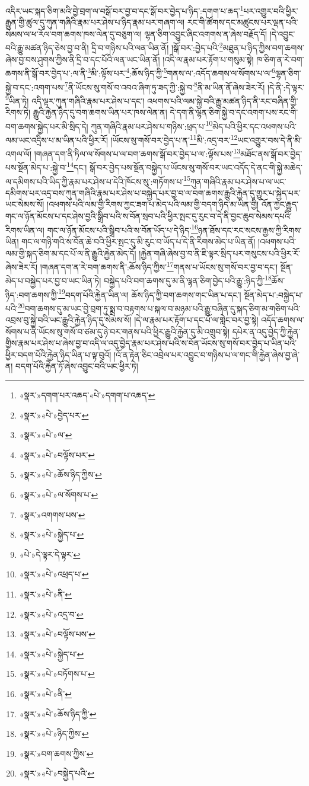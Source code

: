 འདིར་ཡང་སྐད་ཅིག་མའི་བྱེ་བྲག་ལ་བསྒོ་བར་བྱ་བ་དང་སྒོ་བར་བྱེད་པ་ཉིད་:དགག་པ་ཆད་\footnote{«སྣར་»དགག་པར་འཆད་«པེ་»དགག་པ་འཆད་}པར་འགྱུར་བའི་ཕྱིར་རྒྱུན་གྱི་ཚུལ་དུ་ཀུན་གཞིའི་རྣམ་པར་ཤེས་པ་ཉིད་རྣམ་པར་གཞག་ལ། རང་གི་ཚོགས་དང་མཚུངས་པར་ལྡན་པའི་སེམས་ལ་ཕ་རོལ་བག་ཆགས་ཁས་ལེན་དུ་བཅུག་ལ། ལྷན་ཅིག་འབྱུང་ཞིང་འགགས་ན་ཞེས་བརྗོད་དོ། །དེ་འབྱུང་བའི་རྒྱུ་མཚན་ཉིད་ཅེས་བྱ་བ་ནི། དྲི་བ་གཉིས་པའི་ལན་ཡིན་ནོ། །སྒོ་བར་:བྱེད་པའི་\footnote{«སྣར་»«པེ་»བྱེད་པར་}མཐུན་པ་ཉིད་ཀྱིས་བག་ཆགས་ཞེས་བྱ་བས་ཤུགས་ཀྱིས་ནི་དྲི་བ་དང་པོའི་ལན་ཡང་ཡིན་ནོ། །འདི་ལ་རྣམ་པར་རྟོག་པ་གསུམ་སྟེ། ཁ་ཅིག་ན་རེ་བག་ཆགས་ནི་སྒོ་བར་བྱེད་པ་:ལ་ནི་\footnote{«སྣར་»«པེ་»ལ་}མི་:ལྟོས་པར་\footnote{«སྣར་»«པེ་»བལྟོས་པར་}:ཆོས་ཉིད་ཀྱི་\footnote{«སྣར་»«པེ་»ཆོས་ཉིད་ཀྱིས་}གནས་ལ་:འདོད་ཆགས་ལ་སོགས་པ་ལ་\footnote{«སྣར་»«པེ་»ལ་སོགས་པ་}ལྷན་ཅིག་སྐྱེ་བ་དང་:འགག་པས་\footnote{«སྣར་»འགགས་པས་}ནི་ཡོངས་སུ་གསོ་བ་འབའ་ཞིག་ཏུ་ཟད་ཀྱི་:སྐྱེ་བ་\footnote{«སྣར་»«པེ་»སྐྱེད་པ་}ནི་མ་ཡིན་ནོ་ཞེས་ཟེར་རོ། །དེ་ནི་:དེ་ལྟར་\footnote{«པེ་»དེ་ལྟར་དེ་ལྟར་}ཡིན་ཏེ། འདི་ལྟར་ཀུན་གཞིའི་རྣམ་པར་ཤེས་པ་དང་། འཕགས་པའི་ལམ་སྐྱེ་བའི་རྒྱུ་མཚན་ཉིད་ནི་རང་བཞིན་གྱི་རིགས་ཏེ། རྒྱུའི་རྐྱེན་ཉིད་དུ་བག་ཆགས་ཡིན་པར་ཁས་ལེན་ན། དེ་དག་ནི་ལྷན་ཅིག་སྐྱེ་བ་དང་འགག་པས་རང་གི་བག་ཆགས་སྐྱེད་པར་མི་སྲིད་དེ། ཀུན་གཞིའི་རྣམ་པར་ཤེས་པ་གཉིས་:ཕྲད་པ་\footnote{«སྣར་»«པེ་»འཕྲད་པ་}མེད་པའི་ཕྱིར་དང་འཕགས་པའི་ལམ་ཡང་འདྲིས་པ་མ་ཡིན་པའི་ཕྱིར་རོ། །ཡོངས་སུ་གསོ་བར་བྱེད་པ་ན་\footnote{«སྣར་»«པེ་»ནི་}མི་:འདྲ་བར་\footnote{«སྣར་»«པེ་»འདྲ་བ་}ཡང་འགྱུར་བས་དེ་ནི་མི་འགལ་ལོ། །གཞན་དག་ནི་ཏིལ་ལ་སོགས་པ་ལ་བག་ཆགས་སྒོ་བར་བྱེད་པ་ལ་:ལྟོས་པས་\footnote{«སྣར་»«པེ་»བལྟོས་པས་}མཐོང་ནས་སྒོ་བར་བྱེད་པས་སྔོན་མེད་པ་:སྐྱེ་བ་\footnote{«སྣར་»«པེ་»སྐྱེད་པ་}དང་། སྒོ་བར་བྱེད་པས་སྔོན་བསྐྱེད་པ་ཡོངས་སུ་གསོ་བར་ཡང་འདོད་དེ་ནང་གི་སྐྱེ་མཆེད་ལ་དམིགས་པའི་ཡིད་ཀྱི་རྣམ་པར་ཤེས་པ་དེའི་ཁོངས་སུ་:གཏོགས་པ་\footnote{«སྣར་»«པེ་»བཏོགས་པ་}ཀུན་གཞིའི་རྣམ་པར་ཤེས་པ་ལ་ཡང་དམིགས་པར་འདྲ་བས་ཀུན་གཞིའི་རྣམ་པར་ཤེས་པ་བསྐྱེད་པར་བྱ་བ་ལ་བག་ཆགས་རྒྱུའི་རྐྱེན་དུ་གྱུར་པ་སྐྱེད་པར་ཡང་སེམས་སོ། །འཕགས་པའི་ལམ་གྱི་རིགས་ཀྱང་ཟག་པ་མེད་པའི་ལམ་གྱི་བདག་ཉིད་མ་ཡིན་གྱི། འོན་ཀྱང་རྒྱུད་གང་ལ་ཉོན་མོངས་པ་དང་ཤེས་བྱའི་སྒྲིབ་པའི་ས་བོན་སྲབ་པའི་ཕྱིར་སྤང་དུ་རུང་བ་དེ་ནི་བྱང་ཆུབ་སེམས་དཔའི་རིགས་ཡིན་ལ། གང་ལ་ཉོན་མོངས་པའི་སྒྲིབ་པའི་ས་བོན་ཡོད་པ་དེ་ཉིད་\footnote{«སྣར་»«པེ་»ནི་}ཉན་ཐོས་དང་རང་སངས་རྒྱས་ཀྱི་རིགས་ཡིན། གང་ལ་གཉི་གའི་ས་བོན་ཆེ་བའི་ཕྱིར་སྤང་དུ་མི་རུང་བ་ཡོད་པ་དེ་ནི་རིགས་མེད་པ་ཡིན་ནོ། །འཕགས་པའི་ལམ་གྱི་སྐད་ཅིག་མ་དང་པོ་ལ་ནི་རྒྱུའི་རྐྱེན་མེད་དོ། །རྐྱེན་གཞི་ཞེས་བྱ་བ་ནི་ཇི་ལྟར་སྲིད་པར་གསུངས་པའི་ཕྱིར་རོ་ཞེས་ཟེར་རོ། །གཞན་དག་ན་རེ་བག་ཆགས་ནི་:ཆོས་ཉིད་ཀྱིས་\footnote{«སྣར་»«པེ་»ཆོས་ཉིད་ཀྱི་}གནས་པ་ཡོངས་སུ་གསོ་བར་བྱ་བ་དང་། སྔོན་མེད་པ་བསྐྱེད་པར་བྱ་བ་ཡང་ཡིན་ཏེ། བསྐྱེད་པའི་བག་ཆགས་དུ་མ་ནི་ལྷན་ཅིག་བྱེད་པའི་རྒྱུ་:ཉིད་ཀྱི་\footnote{«སྣར་»«པེ་»ཉིད་ཀྱིས་}ཆོས་ཉིད་:བག་ཆགས་ཀྱི་\footnote{«སྣར་»བག་ཆགས་ཀྱིས་}བདག་པོའི་རྐྱེན་ཡིན་ལ། ཆོས་ཉིད་ཀྱི་བག་ཆགས་གང་ཡིན་པ་དང་། སྔོན་མེད་པ་:བསྐྱེད་པ་པའི་\footnote{«སྣར་»«པེ་»བསྐྱེད་པའི་}བག་ཆགས་དུ་མ་ཡང་བྱེ་བྲག་ཏུ་སྨྲ་བ་བརྟགས་པ་སྐལ་བ་མཉམ་པའི་རྒྱུ་བཞིན་དུ་སྐད་ཅིག་མ་གཅིག་པའི་འབྲས་བུ་སྐྱེ་བའི་ཡང་རྒྱུའི་རྐྱེན་ཉིད་དུ་སེམས་སོ། །དེ་ལ་རྣམ་པར་རྟོག་པ་དང་པོ་ལ་གླེང་བར་བྱ་སྟེ། འདོད་ཆགས་ལ་སོགས་པ་ནི་ཡོངས་སུ་གསོ་བ་ཙམ་དུ་ཉེ་བར་གནས་པའི་ཕྱིར་རྒྱུའི་རྐྱེན་དུ་མི་འགྲུབ་སྟེ། དཔེར་ན་འདུ་བྱེད་ཀྱི་རྐྱེན་གྱིས་རྣམ་པར་ཤེས་པ་ཞེས་བྱ་བ་འདི་ལ་འདུ་བྱེད་རྣམ་པར་ཤེས་པའི་ས་བོན་ཡོངས་སུ་གསོ་བར་བྱེད་པ་ཡིན་པའི་ཕྱིར་བདག་པོའི་རྐྱེན་ཉིད་ཡིན་པ་ལྟ་བུའོ། །འོ་ན་རྟེན་ཅིང་འབྲེལ་པར་འབྱུང་བ་གཉིས་པ་ལ་གང་གི་རྐྱེན་ཞེས་བྱ་ཞེ་ན། བདག་པོའི་རྐྱེན་ཏོ་ཞེས་འབྱུང་བའི་ཡང་ཕྱིར་ཏེ། 